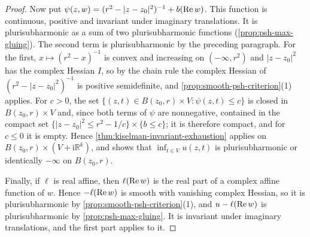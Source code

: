 \begin{proof}
Now put $\psi(z,w)=(r^2-|z-z_0|^2)^{-1}+b(\operatorname{Re} w)$. This function is continuous, positive and invariant under imaginary translations. It is plurisubharmonic as a sum of two plurisubharmonic functions (\cref{prop:psh-max-gluing}). The second term is plurisubharmonic by the preceding paragraph. For the first, $x\mapsto(r^2-x)^{-1}$ is convex and increasing on $(-\infty,r^2)$ and $|z-z_0|^2$ has the complex Hessian $I$, so by the chain rule the complex Hessian of $(r^2-|z-z_0|^2)^{-1}$ is positive semidefinite, and \cref{prop:smooth-psh-criterion}(1) applies. For $c>0$, the set $\{(z,t)\in B(z_0,r)\times V:\psi(z,t)\leq c\}$ is closed in $B(z_0,r)\times V$ and, since both terms of $\psi$ are nonnegative, contained in the compact set $\{|z-z_0|^2\leq r^2-1/c\}\times\{b\leq c\}$; it is therefore compact, and for $c\leq0$ it is empty. Hence \cref{thm:kiselman-invariant-exhaustion} applies on $B(z_0,r)\times(V+\mathrm{i}\mathbb R^k)$, and shows that $\inf_{t\in V}u(z,t)$ is plurisubharmonic or identically $-\infty$ on $B(z_0,r)$.

Finally, if $\ell$ is real affine, then $\ell(\operatorname{Re} w)$ is the real part of a complex affine function of $w$. Hence $-\ell(\operatorname{Re} w)$ is smooth with vanishing complex Hessian, so it is plurisubharmonic by \cref{prop:smooth-psh-criterion}(1), and $u-\ell(\operatorname{Re} w)$ is plurisubharmonic by \cref{prop:psh-max-gluing}. It is invariant under imaginary translations, and the first part applies to it.
\end{proof}
